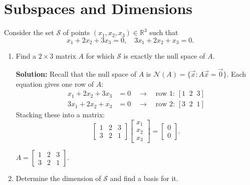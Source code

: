\documentclass[10pt]{article}
\theoremstyle{definition}
\theoremstyle{plain}
\newcommand{\RR}{\mathbb{R}}
\newcommand{\NN}{\mathcal{N}}
\begin{document}
\newpage

\section{Subspaces and Dimensions}

Consider the set $\mathcal{S}$ of points $(x_1, x_2, x_3) \in \RR^3$ such that
\begin{equation}
    x_1 + 2x_2 + 3x_3 = 0, \quad 3x_1 + 2x_2 + x_3 = 0.
\end{equation}

\begin{enumerate}[label=(\alph*)]
    \item Find a $2 \times 3$ matrix $A$ for which $\mathcal{S}$ is exactly the null space of $A$.

    \textbf{Solution:} Recall that the null space of $A$ is $\NN(A) = \{\vec{x} : A\vec{x} = \vec{0}\}$. Each equation gives one row of $A$:
    \begin{align}
        x_1 + 2x_2 + 3x_3 &= 0 \quad \longrightarrow \quad \text{row 1: } [1 \;\; 2 \;\; 3] \\
        3x_1 + 2x_2 + x_3 &= 0 \quad \longrightarrow \quad \text{row 2: } [3 \;\; 2 \;\; 1]
    \end{align}
    Stacking these into a matrix:
    \begin{equation}
        \begin{bmatrix} 1 & 2 & 3 \\ 3 & 2 & 1 \end{bmatrix} \begin{bmatrix} x_1 \\ x_2 \\ x_3 \end{bmatrix} = \begin{bmatrix} 0 \\ 0 \end{bmatrix}.
    \end{equation}

    \begin{result}
    $A = \begin{bmatrix} 1 & 2 & 3 \\ 3 & 2 & 1 \end{bmatrix}$.
    \end{result}

    \item Determine the dimension of $\mathcal{S}$ and find a basis for it.


\end{enumerate}
\end{document}
